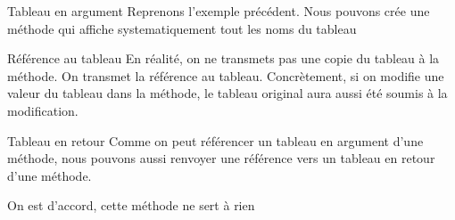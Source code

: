 \begin{frame}{Tableau en argument}
    Reprenons l'exemple précédent. Nous pouvons crée une méthode qui affiche systematiquement tout les noms du tableau
    

    \begin{alertblock}{Référence au tableau}
        En réalité, on ne transmets pas une copie du tableau à la méthode. On transmet la référence au tableau.
        Concrètement, si on modifie une valeur du tableau dans la méthode,
        le tableau original aura aussi été soumis à la modification.
    \end{alertblock}
\end{frame}

\begin{frame}{Tableau en retour}
    Comme on peut référencer un tableau en argument d'une méthode,
    nous pouvons aussi renvoyer une référence vers un tableau en retour d'une méthode.
    

    \center\tiny On est d'accord, cette méthode ne sert à rien
\end{frame}